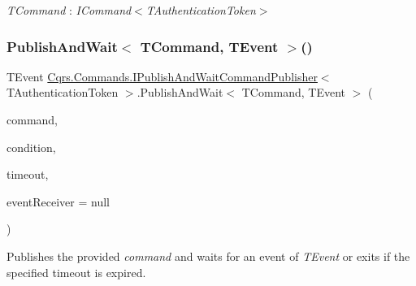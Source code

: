 \begin{Desc}
\item[Type Constraints]\begin{description}
\item[{\em T\+Command} : {\em I\+Command$<$T\+Authentication\+Token$>$}]\end{description}
\end{Desc}
\mbox{\label{interfaceCqrs_1_1Commands_1_1IPublishAndWaitCommandPublisher_a0460fc2091d52ba3463973fea5028bc6_a0460fc2091d52ba3463973fea5028bc6}} 
\subsubsection{\texorpdfstring{Publish\+And\+Wait$<$ T\+Command, T\+Event $>$()}{PublishAndWait< TCommand, TEvent >()}\hspace{0.1cm}{\footnotesize\ttfamily [6/6]}}
{\footnotesize\ttfamily T\+Event \hyperlink{interfaceCqrs_1_1Commands_1_1IPublishAndWaitCommandPublisher}{Cqrs.\+Commands.\+I\+Publish\+And\+Wait\+Command\+Publisher}$<$ T\+Authentication\+Token $>$.Publish\+And\+Wait$<$ T\+Command, T\+Event $>$ (\begin{DoxyParamCaption}\item[{T\+Command}]{command,  }\item[{Func$<$ I\+Enumerable$<$ \hyperlink{interfaceCqrs_1_1Events_1_1IEvent}{I\+Event}$<$ T\+Authentication\+Token $>$$>$, T\+Event $>$}]{condition,  }\item[{Time\+Span}]{timeout,  }\item[{\hyperlink{interfaceCqrs_1_1Events_1_1IEventReceiver}{I\+Event\+Receiver}$<$ T\+Authentication\+Token $>$}]{event\+Receiver = {\ttfamily null} }\end{DoxyParamCaption})}



Publishes the provided {\itshape command}  and waits for an event of {\itshape T\+Event}  or exits if the specified timeout is expired. 


